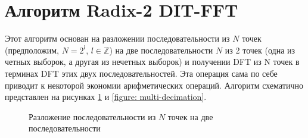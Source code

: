 \section{Алгоритм Radix-2 DIT-FFT}
Этот алгоритм основан на разложении последовательности из $N$ точек (предположим, $N = 2^l$, $l\in\mathbb{Z}$) на две последовательности $N$ из 2 точек (одна из четных выборок, а другая из нечетных выборок) и получении DFT из N точек в терминах DFT этих двух последовательностей. Эта операция сама по себе приводит к некоторой экономии арифметических операций. Алгоритм схематично представлен на рисунках \ref{figure: one decimation} и \ref{figure: multi-decimation}.
\begin{figure}
\centering
{}
\caption{Разложение последовательности из $N$ точек на две последовательности}
\label{figure: one decimation}
\end{figure}
